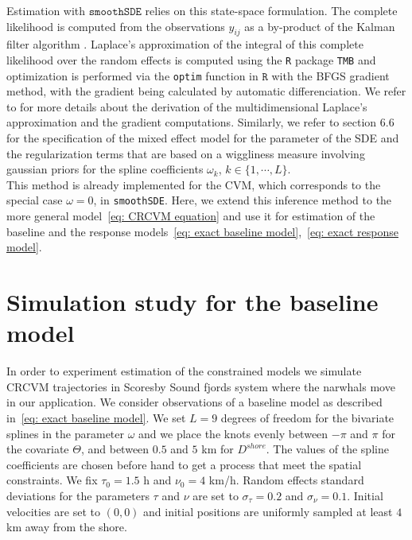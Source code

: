 \documentclass[11pt]{article}
\newcommand {\1}{\mathbb{1}}
\theoremstyle{definition}
\theoremstyle{remark}
\theoremstyle{remark}
\begin{document}
Estimation with $\texttt{smoothSDE}$ relies on this state-space formulation.
The complete likelihood is computed from the observations $y_{ij}$ as a by-product of the Kalman filter algorithm \cite{michelot_varying-coefficient_2021}.
Laplace's approximation of the integral of this complete likelihood over the random effects is computed using the \texttt{R} package \texttt{TMB}  and optimization is performed via the \texttt{optim} function in $\texttt{R}$ with the BFGS gradient method, with the gradient being calculated by automatic differenciation. We refer to \cite{kristensen_tmb_2016} for more details about the derivation of the multidimensional Laplace's approximation and the gradient computations. Similarly, we refer to \cite{wood_generalized_2017} section $6.6$ for the specification of the mixed effect model for the parameter of the SDE and the regularization terms that are based on a wiggliness measure involving gaussian priors for the spline coefficients $\omega_k$, $k \in \{1,\cdots,L\}$. \\
This method is already implemented for the CVM, which corresponds to the special case $\omega=0$, in \texttt{smoothSDE}. Here, we extend this inference method to the more general model~\eqref{eq: CRCVM equation} and use it for estimation of the baseline and the response models~\eqref{eq: exact baseline model},~\eqref{eq: exact response model}.




\section{Simulation study for the baseline model}
\label{section: simulation constrained motion}
In order to experiment estimation of the constrained models we simulate CRCVM trajectories in Scoresby Sound fjords system where the narwhals move in our application. We consider observations of a baseline model as described in~\eqref{eq: exact baseline model}. We set $L=9$ degrees of freedom for the bivariate splines in the parameter $\omega$ and  we place the knots evenly between $-\pi$ and $\pi$ for the covariate $\Theta$, and between $0.5$ and $5$ km for $D^{shore}$. The values of the spline coefficients are chosen before hand to get a process that meet the spatial constraints. We fix $\tau_0=1.5$ h and $\nu_0=4$ km/h. Random effects standard deviations for the parameters $\tau$ and $\nu$ are set to $\sigma_{\tau}=0.2$ and $\sigma_{\nu}=0.1$. Initial velocities are set to $(0,0)$ and initial positions are uniformly sampled at least $4$ km away from the shore. \\
\end{document}
